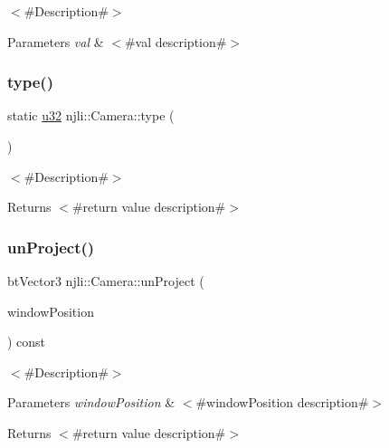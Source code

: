 $<$\#\+Description\#$>$


\begin{DoxyParams}{Parameters}
{\em val} & $<$\#val description\#$>$ \\
\hline
\end{DoxyParams}
\mbox{\label{classnjli_1_1_camera_a2f963b324689cb9eee90fc5f4b8fcb48}} 
\subsubsection{\texorpdfstring{type()}{type()}}
{\footnotesize\ttfamily static \mbox{\hyperlink{_util_8h_a10e94b422ef0c20dcdec20d31a1f5049}{u32}} njli\+::\+Camera\+::type (\begin{DoxyParamCaption}{ }\end{DoxyParamCaption})\hspace{0.3cm}{\ttfamily [static]}}

$<$\#\+Description\#$>$

\begin{DoxyReturn}{Returns}
$<$\#return value description\#$>$ 
\end{DoxyReturn}
\mbox{\label{classnjli_1_1_camera_af43930c16c51df25a5fc743777fbb38f}} 
\subsubsection{\texorpdfstring{un\+Project()}{unProject()}}
{\footnotesize\ttfamily bt\+Vector3 njli\+::\+Camera\+::un\+Project (\begin{DoxyParamCaption}\item[{const bt\+Vector2 \&}]{window\+Position }\end{DoxyParamCaption}) const}

$<$\#\+Description\#$>$


\begin{DoxyParams}{Parameters}
{\em window\+Position} & $<$\#window\+Position description\#$>$\\
\hline
\end{DoxyParams}
\begin{DoxyReturn}{Returns}
$<$\#return value description\#$>$ 
\end{DoxyReturn}
\mbox{\label{classnjli_1_1_camera_a2389fe55bb0d6447260b292c3835d6da}} 
